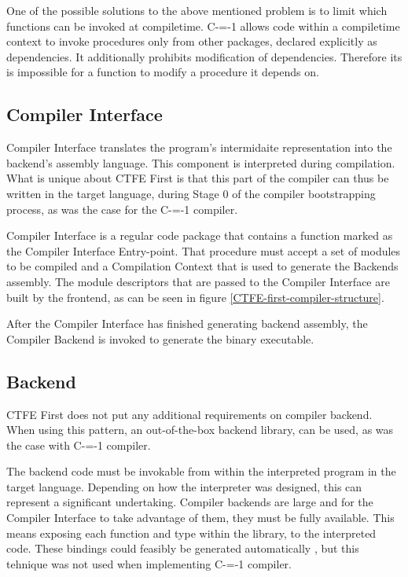 One of the possible solutions to the above mentioned problem is to limit which functions can be invoked at compiletime.
C-=-1 allows code within a compiletime context to invoke procedures only from other packages, declared explicitly as dependencies.
It additionally prohibits modification of dependencies.
Therefore its is impossible for a function to modify a procedure it depends on.%

\subsection{Compiler Interface}
\label{compiler-interface}

Compiler Interface translates the program's intermidaite representation into the backend's assembly language.
This component is interpreted during compilation.
What is unique about CTFE First is that this part of the compiler can thus be written in the target language, during Stage 0 of the compiler bootstrapping process, as was the case for the C-=-1 compiler\cite{puntambekar:compiler_design, novillo2007gcc, grabski2022compilation}.

Compiler Interface is a regular code package that contains a function marked as the Compiler Interface Entry-point.
That procedure must accept a set of modules to be compiled and a Compilation Context that is used to generate the Backends assembly.
The module descriptors that are passed to the Compiler Interface are built by the frontend, as can be seen in figure \ref{CTFE-first-compiler-structure}.

After the Compiler Interface has finished generating backend assembly, the Compiler Backend is invoked to generate the binary executable.
\subsection{Backend}
\label{backend}

CTFE First does not put any additional requirements on compiler backend.
When using this pattern, an out-of-the-box backend library, can be used, as was the case with C-=-1 compiler.

The backend code must be invokable from within the interpreted program in the target language.
Depending on how the interpreter was designed, this can represent a significant undertaking.
Compiler backends are large and for the Compiler Interface to take advantage of them, they must be fully available.
This means exposing each function and type within the library, to the interpreted code.
These bindings could feasibly be generated automatically \cite{marshalling_auto_generation}, but this tehnique was not used when implementing C-=-1 compiler.
